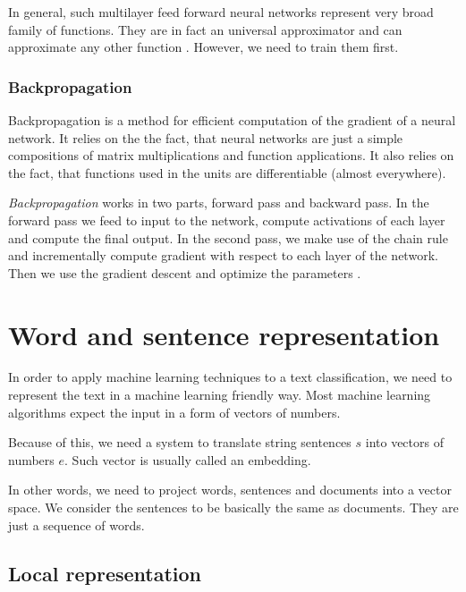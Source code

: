     In general, such multilayer feed forward neural networks represent very broad family of functions.
    They are in fact an universal approximator and can approximate any other function \cite{cybenko1989approximation}.
    However, we need to train them first.
    
    \subsubsection{Backpropagation} \label{sec:backprop}
    
    Backpropagation is a method for efficient computation of the gradient of a neural network.
    It relies on the the fact, that neural networks are just a simple compositions of matrix multiplications and function applications. 
    It also relies on the fact, that functions used in the units are differentiable (almost everywhere).
    
    \textit{Backpropagation} works in two parts, forward pass and backward pass.
    In the forward pass we feed to input to the network, compute activations of each layer and compute the final output.
    In the second pass, we make use of the chain rule and incrementally compute gradient with respect to each layer of the network.
    Then we use the gradient descent and optimize the parameters \cite{rumelhart1986david}.
    
    \* %
    
    
\section{Word and sentence representation}

    In order to apply machine learning techniques to a text classification, 
    we need to represent the text in a machine learning friendly way.
    Most machine learning algorithms expect the input in a form of vectors of numbers. 
    
    Because of this, we need a system to translate string sentences $s$ into vectors of numbers $e$.
    Such vector is usually called an embedding. 
    
    In  other words, we need to project words, sentences and documents into a vector space.
    We consider the sentences to be basically the same as documents. 
    They are just a sequence of words.
    
    \subsection{Local representation} \label{sec:local:representation}
    
